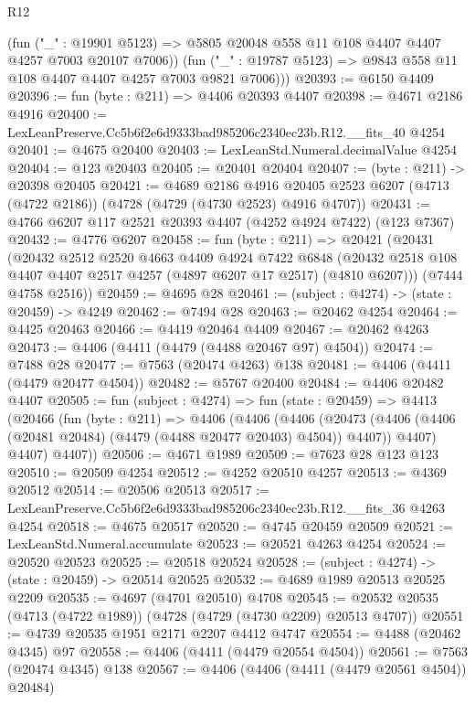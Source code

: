 \begin{lexlean}{R12}
\begin{coremodule}
          (fun ("_" : @19901 @5123) =>
          @5805 @20048 @558 @11 @108 @4407 @4407 @4257 @7003 @20107 @7006))
        (fun ("_" : @19787 @5123) => @9843 @558 @11 @108 @4407 @4407 @4257 @7003 @9821 @7006)))
@20393 := @6150 @4409
@20396 := fun (byte : @211) => @4406 @20393 @4407
@20398 := @4671 @2186 @4916
@20400 := LexLeanPreserve.Cc5b6f2e6d9333bad985206c2340ec23b.R12.__fits_40 @4254
@20401 := @4675 @20400
@20403 := LexLeanStd.Numeral.decimalValue @4254
@20404 := @123 @20403
@20405 := @20401 @20404
@20407 := (byte : @211) -> @20398 @20405
@20421 := @4689
    @2186
    @4916
    @20405
    @2523
    @6207
    (@4713 (@4722 @2186))
    (@4728 (@4729 (@4730 @2523) @4916 @4707))
@20431 := @4766 @6207 @117 @2521 @20393 @4407 (@4252 @4924 @7422) (@123 @7367)
@20432 := @4776 @6207
@20458 := fun (byte : @211) =>
  @20421
    (@20431
      (@20432
        @2512
        @2520
        @4663
        @4409
        @4924
        @7422
        @6848
        (@20432 @2518 @108 @4407 @4407 @2517 @4257 (@4897 @6207 @17 @2517) (@4810 @6207)))
      (@7444 @4758 @2516))
@20459 := @4695 @28
@20461 := (subject : @4274) -> (state : @20459) -> @4249
@20462 := @7494 @28
@20463 := @20462 @4254
@20464 := @4425 @20463
@20466 := @4419 @20464 @4409
@20467 := @20462 @4263
@20473 := @4406 (@4411 (@4479 (@4488 @20467 @97) @4504))
@20474 := @7488 @28
@20477 := @7563 (@20474 @4263) @138
@20481 := @4406 (@4411 (@4479 @20477 @4504))
@20482 := @5767 @20400
@20484 := @4406 @20482 @4407
@20505 := fun (subject : @4274) =>
  fun (state : @20459) =>
  @4413
    (@20466
      (fun (byte : @211) =>
      @4406
        (@4406
          (@4406
            (@20473 (@4406 (@4406 (@20481 @20484) (@4479 (@4488 @20477 @20403) @4504)) @4407))
            @4407)
          @4407)
        @4407))
@20506 := @4671 @1989
@20509 := @7623 @28 @123 @123
@20510 := @20509 @4254
@20512 := @4252 @20510 @4257
@20513 := @4369 @20512
@20514 := @20506 @20513
@20517 := LexLeanPreserve.Cc5b6f2e6d9333bad985206c2340ec23b.R12.__fits_36 @4263 @4254
@20518 := @4675 @20517
@20520 := @4745 @20459 @20509
@20521 := LexLeanStd.Numeral.accumulate
@20523 := @20521 @4263 @4254
@20524 := @20520 @20523
@20525 := @20518 @20524
@20528 := (subject : @4274) -> (state : @20459) -> @20514 @20525
@20532 := @4689 @1989 @20513 @20525 @2209
@20535 := @4697 (@4701 @20510) @4708
@20545 := @20532 @20535 (@4713 (@4722 @1989)) (@4728 (@4729 (@4730 @2209) @20513 @4707))
@20551 := @4739 @20535 @1951 @2171 @2207 @4412 @4747
@20554 := @4488 (@20462 @4345) @97
@20558 := @4406 (@4411 (@4479 @20554 @4504))
@20561 := @7563 (@20474 @4345) @138
@20567 := @4406 (@4406 (@4411 (@4479 @20561 @4504)) @20484)

\end{coremodule}
\end{lexlean}
